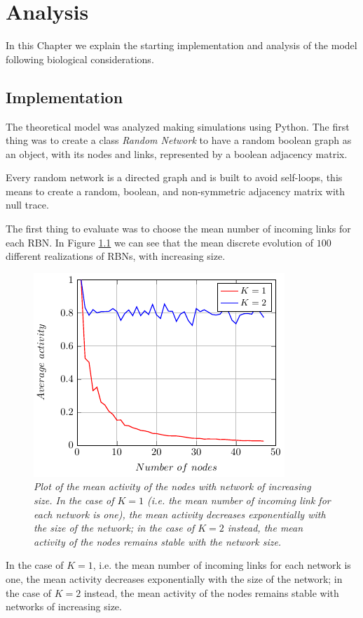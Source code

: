 \chapter{Analysis}\label{analysis}
\lhead[\fancyplain{}{\bfseries\thepage}]{\fancyplain{}{\bfseries\rightmark}}

In this Chapter we explain the starting implementation and analysis of the model following biological considerations.

\section{Implementation}

The theoretical model was analyzed making simulations using Python.
The first thing was to create a class \emph{Random Network} to have a random boolean graph as an object, with its nodes and links, represented by a boolean adjacency matrix.

Every random network is a directed graph and is built to avoid self-loops, this means to create a random, boolean, and non-symmetric adjacency matrix with null trace.

The first thing to evaluate was to choose the mean number of incoming links for each RBN. In Figure \ref{fig:K} we can see that the mean discrete evolution of $100$ different realizations of RBNs, with increasing size.
\begin{figure}[h]
\centering
\includegraphics[scale=1.5]{images/K.pdf}
\caption{\emph{Plot of the mean activity of the nodes with network of increasing size.
In the case of $K=1$ (i.e. the mean number of incoming link for each network is one), the mean activity decreases exponentially with the size of the network; in the case of $K=2$ instead, the mean activity of the nodes remains stable with the network size.}}
\label{fig:K}
\end{figure}
In the case of $K=1$, i.e. the mean number of incoming links for each network is one, the mean activity decreases exponentially with the size of the network; in the case of $K=2$ instead, the mean activity of the nodes remains stable with networks of increasing size.
